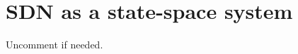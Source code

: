 \documentclass[conference]{IEEEtran}
\begin{document}
\newpage
\section{SDN as a state-space system}
\label{sec:statespace}

Uncomment if needed.

\end{document}
